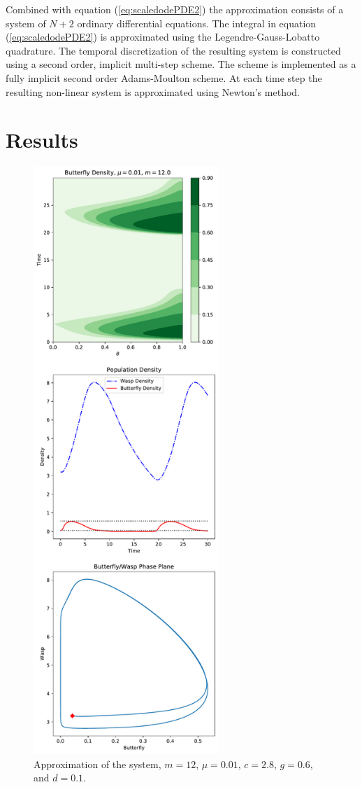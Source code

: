 \documentclass[12pt]{article}
\begin{document}
Combined with equation (\ref{eq:scaledodePDE2}) the approximation
consists of a system of $N+2$ ordinary differential equations. The
integral in equation (\ref{eq:scaledodePDE2}) is approximated using
the Legendre-Gauss-Lobatto quadrature. The temporal discretization of
the resulting system is constructed using a second order, implicit
multi-step scheme. The scheme is implemented as a fully implicit
second order Adams-Moulton scheme\cite{ascher2011first}. At each time
step the resulting non-linear system is approximated using Newton's
method.

\section{Results}
\label{section:results}

\begin{figure}[htb]
  \centering
  \includegraphics[width=7cm]{approximation-mu-01-m-12.pdf}
  \caption[Approximation with $m=12$ and $\mu=0.01$.]{Approximation of
    the system, $m=12$, $\mu=0.01$, $c=2.8$, $g=0.6$, and $d=0.1$. }
  \label{fig:approximationM12Mu01}
\end{figure}
\end{document}

